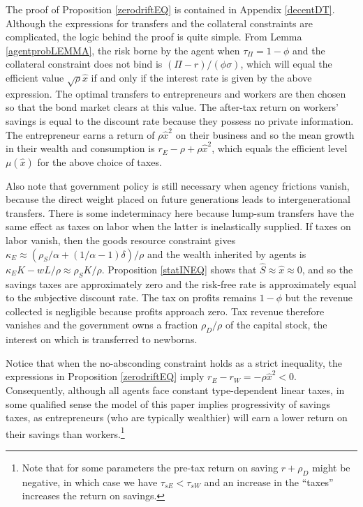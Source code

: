 \documentclass[11pt]{article}
\theoremstyle{plain}
\theoremstyle{definition} %
\begin{document}


The proof of Proposition \ref{zerodriftEQ} is contained in Appendix \ref{decentDT}. Although the expressions for transfers and the collateral constraints are complicated, the logic behind the proof is quite simple. From Lemma \ref{agentprobLEMMA}, the risk borne by the agent when $\tau_{\Pi} = 1 - \phi$ and the collateral constraint does not bind is $(\Pi - r)/(\phi\sigma)$, which will equal the efficient value $\sqrt{\rho}\hat{x}$ if and only if the interest rate is given by the above expression. The optimal transfers to entrepreneurs and workers are then chosen so that the bond market clears at this value. The after-tax return on workers' savings is equal to the discount rate because they possess no private information. The entrepreneur earns a return of $\rho \hat{x}^2$ on their business and so the mean growth in their wealth and consumption is $r_E - \rho + \rho\hat{x}^2$, which equals the efficient level $\mu(\hat{x})$ for the above choice of taxes. 


Also note that government policy is still necessary when agency frictions vanish, because the direct weight placed on future generations leads to intergenerational transfers. There is some indeterminacy here because lump-sum transfers have the same effect as taxes on labor when the latter is inelastically supplied. If taxes on labor vanish, then the goods resource constraint gives $\kappa_E \approx (\rho_S/\alpha + (1/\alpha-1)\delta)/\rho$ and the wealth inherited by agents is $\kappa_EK - wL/\rho \approx \rho_SK/\rho$. Proposition \ref{statINEQ} shows that $\hat{S} \approx \hat{x} \approx 0$, and so the savings taxes are approximately zero and the risk-free rate is approximately equal to the subjective discount rate. The tax on profits remains $1 - \phi$ but the revenue collected is negligible because profits approach zero. Tax revenue therefore vanishes and the government owns a fraction $\rho_D/\rho$ of the capital stock, the interest on which is transferred to newborns. 

Notice that when the no-absconding constraint holds as a strict inequality, the expressions in Proposition \ref{zerodriftEQ} imply $r_E - r_W = - \rho \hat{x}^2 < 0$. Consequently, although all agents face constant type-dependent linear taxes, in some qualified sense the model of this paper implies progressivity of savings taxes, as entrepreneurs (who are typically wealthier) will earn a lower return on their savings than workers.\footnote{Note that for some parameters the pre-tax return on saving $r + \rho_D$ might be negative, in which case we have $\tau_{sE} < \tau_{sW}$ and an increase in the ``taxes'' increases the return on savings.} 
\end{document}
